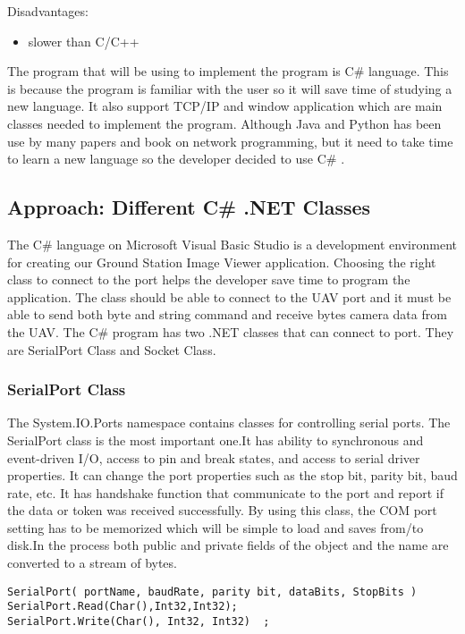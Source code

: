 Disadvantages:
\begin{itemize}
\item slower than C/C++
\end{itemize}

The program that will be using to implement the program is C\# language. 
This is because the program is familiar with the user so it will save time of studying a new language.
It also support TCP/IP and window application which are main classes needed to implement the program.
Although Java and Python has been use by many papers and book on network programming, but it need to take time to learn a new language so the developer decided to use C\# \cite{normanM,guidoR,kennethC,elliotH}.



\subsection{Approach: Different C\# .NET Classes}
The C\# language on Microsoft Visual Basic Studio is a development environment for creating our Ground Station Image Viewer application. Choosing the right class to connect to the port helps the developer save time to program the application. The class should be able to connect to the UAV port and it must be able to send both byte and string command and receive bytes camera data from the UAV.  The C\# program has two .NET classes that can connect to port. They are SerialPort Class and Socket Class.
 
\subsubsection{SerialPort Class}
The System.IO.Ports namespace contains classes for controlling serial ports. The SerialPort class is the most important one.It has ability to synchronous and event-driven I/O, access to pin and break states, and access to serial driver properties\cite{peak_netFrame}. It can change the port properties such as the stop bit, parity bit, baud rate, etc. It has handshake function that communicate to the port and report if the data or token was received successfully.
By using this class, the COM port setting has to be memorized which will be simple to load and saves from/to disk.In the process both public and private fields of the object and the name are converted to a stream of bytes.

\begin{lstlisting}[caption=Serial Port class connection\, read and write method, label=serialPortconn]
SerialPort( portName, baudRate, parity bit, dataBits, StopBits ) 
SerialPort.Read(Char(),Int32,Int32);
SerialPort.Write(Char(), Int32, Int32)	;
\end{lstlisting}


